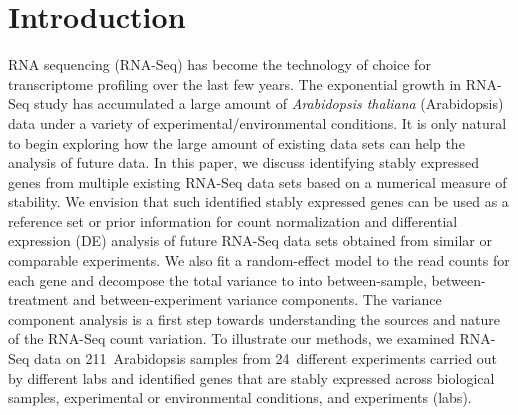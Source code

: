 \documentclass[letterpaper,12pt]{article}
\newcommand{\howmanySamples}{211~}
\newcommand{\howmanylab}{24~}
\begin{document}

\section{Introduction}\label{section:Introduction}

RNA sequencing (RNA-Seq) has become the technology of choice for transcriptome
profiling over the last few years. The exponential growth in RNA-Seq study has
accumulated a large amount of \textit{Arabidopsis thaliana} (Arabidopsis) data under a variety of experimental/environmental conditions.  It is only natural to begin exploring
how the large amount of existing data sets can help the analysis of future
data.  In this paper, we discuss identifying stably expressed genes from
multiple existing RNA-Seq data sets based on a numerical measure of stability.
We envision that such identified stably expressed genes can be used as a
reference set or prior information for count normalization and differential
expression (DE) analysis of future RNA-Seq data sets obtained from similar or
comparable experiments.  We also fit a random-effect model to the read counts
for each gene and decompose the total variance to into between-sample,
between-treatment and between-experiment variance components. The variance component
analysis is a first step towards understanding the sources and nature of the
RNA-Seq count variation.  To illustrate our methods, we examined RNA-Seq data
on \howmanySamples Arabidopsis  samples from \howmanylab different experiments carried out by
different labs and identified genes that are stably expressed across
biological samples, experimental or environmental conditions, and experiments
(labs).  
\end{document}
